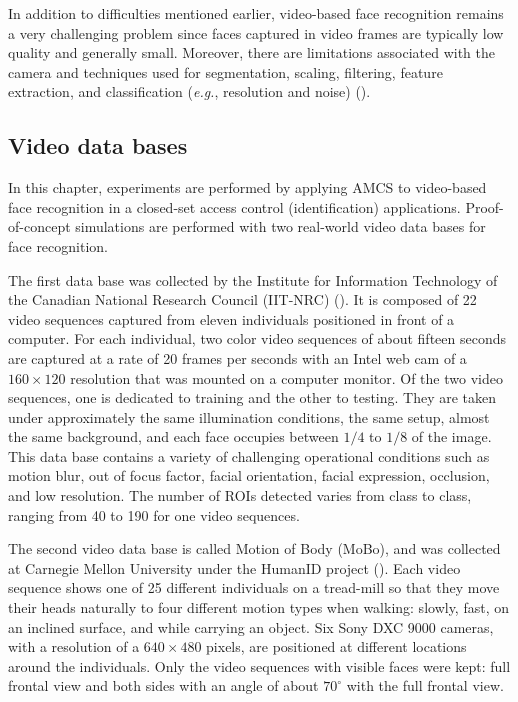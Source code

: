 In addition to difficulties mentioned earlier, video-based face recognition remains a very challenging problem since faces captured in video frames are typically low quality and generally small.
Moreover, there are limitations associated with the camera and techniques used for segmentation, scaling, filtering, feature extraction, and classification (\emph{e.g.}, resolution and noise) (\cite{gorodnichy05, matta09, zhou03}).

\subsection{Video data bases}
\label{sec:c2_db}

In this chapter, experiments are performed by applying AMCS to video-based face recognition in a closed-set access control (identification) applications.
Proof-of-concept simulations are performed with two real-world video data bases for face recognition.

The first data base was collected by the Institute for Information Technology of the Canadian National Research Council (IIT-NRC) (\cite{gorodnichy05}).
It is composed of 22 video sequences captured from eleven individuals positioned in front of a computer.
For each individual, two color video sequences of about fifteen seconds are captured at a rate of 20 frames per seconds with an Intel web cam of a $160\times120$ resolution that was mounted on a computer monitor.
Of the two video sequences, one is dedicated to training and the other to testing.
They are taken under approximately the same illumination conditions, the same setup, almost the same background, and each face occupies between $1/4$ to $1/8$ of the image.
This data base contains a variety of challenging operational conditions such as motion blur, out of focus factor, facial orientation, facial expression, occlusion, and low resolution.
The number of ROIs detected varies from class to class, ranging from 40 to 190 for one video sequences.

The second video data base is called Motion of Body (MoBo), and was collected at Carnegie Mellon University under the HumanID project (\cite{gross02}).
Each video sequence shows one of 25 different individuals on a tread-mill so that they move their heads naturally to four different motion types when walking: slowly, fast, on an inclined surface, and while carrying an object.
Six Sony DXC 9000 cameras, with a resolution of a $640\times480$ pixels, are positioned at different locations around the individuals.
Only the video sequences with visible faces were kept: full frontal view and both sides with an angle of about $70^\circ$ with the full frontal view.

